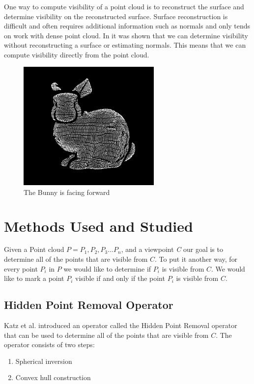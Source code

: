 \documentclass[11pt]{article}
\begin{document}
One way to compute visibility of a point cloud is to reconstruct the surface and determine visibility on the reconstructed surface. Surface reconstruction is difficult and often requires additional information such as normals and only tends on work with dense point cloud. In \cite{Katz07} it was shown that we can determine visibility without reconstructing a surface or estimating normals. This means that we can compute visibility directly from the point cloud. 

\begin{figure}[h]
\includegraphics[width=7cm]{bunny-facing-front}
\centering
\caption{The Bunny is facing forward}
\label{fig:bunny-facing-front}
\end{figure}

\pagebreak
\section{Methods Used and Studied}

Given a Point cloud $ P = P_{1},P_{2},P_{3} ... P_{n} $, and a viewpoint \emph{C} our goal is to determine all of the points that are visible from $C $. To put it another way, for every point $ P_{i} $ in $ P$ we would like to determine if $ P_{i} $ is visible from $ C$. We would like to mark a point $ P_{i} $ visible if and only if the point $ P_{i} $ is visible from $ C$.

\subsection{Hidden Point Removal Operator}
Katz et al. \cite{Katz07} introduced an operator called the Hidden Point Removal operator that can be used to determine all of the points that are visible from $C$. The operator consists of two steps:

\begin{enumerate}
\item Spherical inversion
\item Convex hull construction
\end{enumerate}
\end{document}
